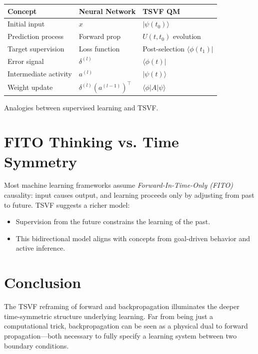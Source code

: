 \documentclass[../main.tex]{subfiles} %
\begin{document}
{{{{{{\begin{marginfigure}
\hspace{-38pt}
\footnotesize
\begin{tabular}{@{}lll@{}}
\toprule
\textbf{Concept} & \textbf{Neural Network} & \textbf{TSVF QM} \\
\midrule
Initial input & \(x\) & \(|\psi(t_0)\rangle\) \\
Prediction process & Forward prop & \(U(t, t_0)\) evolution \\
Target supervision & Loss function & Post-selection \(\langle\phi(t_1)|\) \\
Error signal & \(\delta^{(l)}\) & \(\langle\phi(t)|\) \\
Intermediate activity & \(a^{(l)}\) & \(|\psi(t)\rangle\) \\
Weight update & \(\delta^{(l)} (a^{(l-1)})^\top\) & \(\langle \phi | A | \psi \rangle\) \\
\bottomrule
\end{tabular}
\caption{Analogies between supervised learning and TSVF.}
\end{marginfigure}

\section{FITO Thinking vs. Time Symmetry}

Most machine learning frameworks assume \emph{Forward-In-Time-Only (FITO)} causality: input causes output, and learning proceeds only by adjusting from past to future. TSVF suggests a richer model:

\begin{itemize}
  \item Supervision from the future constrains the learning of the past.
  \item This bidirectional model aligns with concepts from goal-driven behavior and active inference.
\end{itemize}

\newpage

\section{Conclusion}

The TSVF reframing of forward and backpropagation illuminates the deeper time-symmetric structure underlying learning. Far from being just a computational trick, backpropagation can be seen as a physical dual to forward propagation—both necessary to fully specify a learning system between two boundary conditions.

}}}}}}
\end{document}
